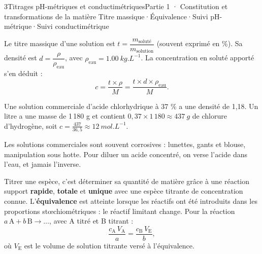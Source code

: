 \begin{ouverture}[titrage]{3}{Titrages pH-métriques et conductimétriques}{Partie 1 · Constitution et transformations de la matière}
{Titre massique\enspace·\enspace Équivalence\enspace·\enspace Suivi pH-métrique\enspace·\enspace Suivi conductimétrique}
\end{ouverture}
\essentiel
{}
\begin{definition}
Le titre massique d'une solution est $t=\dfrac{m_\text{soluté}}{m_\text{solution}}$ (souvent exprimé en \%).
Sa densité est $d=\dfrac{\rho}{\rho_\text{eau}}$, avec $\rho_\text{eau}=\qty{1,00}{kg.L^{-1}}$. La concentration en
soluté apporté s'en déduit :
\[c=\frac{t\times\rho}{M}=\frac{t\times d\times\rho_\text{eau}}{M}.\]
\end{definition}
\begin{exemple}
Une solution commerciale d'acide chlorhydrique à 37 \% a une densité de 1,18. Un litre a une masse de 1\,180 g et
contient $0{,}37\times1\,180\approx\qty{437}{g}$ de chlorure d'hydrogène, soit
$c=\frac{437}{36{,}5}\approx\qty{12}{mol.L^{-1}}$.
\end{exemple}
\begin{attention}
Les solutions commerciales sont souvent corrosives : lunettes, gants et blouse, manipulation sous hotte.
Pour diluer un acide concentré, on verse l'acide dans l'eau, et jamais l'inverse.
\end{attention}
\begin{definition}
Titrer une espèce, c'est déterminer sa quantité de matière grâce à une réaction support \textbf{rapide},
\textbf{totale} et \textbf{unique} avec une espèce titrante de concentration connue. L'\textbf{équivalence} est
atteinte lorsque les réactifs ont été introduits dans les proportions stœchiométriques : le réactif limitant
change. Pour la réaction $a\,\mathrm{A}+b\,\mathrm{B}\longrightarrow\dots$, avec A titré et B titrant :
\[\frac{c_\mathrm{A}\,V_\mathrm{A}}{a}=\frac{c_\mathrm{B}\,V_\mathrm{E}}{b},\]
où $V_\mathrm{E}$ est le volume de solution titrante versé à l'équivalence.
\end{definition}
